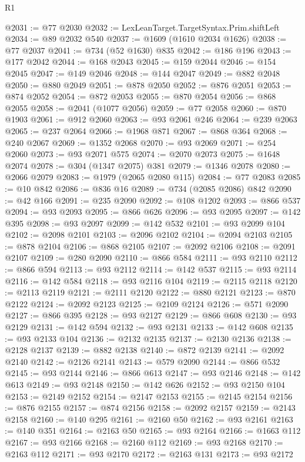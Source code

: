 \begin{lexlean}{R1}
\begin{coremodule}
@2031 := @77 @2030
@2032 := LexLeanTarget.TargetSyntax.Prim.shiftLeft
@2034 := @89 @2032 @540
@2037 := @1609 (@1610 @2034 @1626)
@2038 := @77 @2037
@2041 := @734 (@52 @1630) @835
@2042 := @186 @196
@2043 := @177 @2042
@2044 := @168 @2043
@2045 := @159 @2044
@2046 := @154 @2045
@2047 := @149 @2046
@2048 := @144 @2047
@2049 := @882 @2048
@2050 := @880 @2049
@2051 := @878 @2050
@2052 := @876 @2051
@2053 := @874 @2052
@2054 := @872 @2053
@2055 := @870 @2054
@2056 := @868 @2055
@2058 := @2041 (@1077 @2056)
@2059 := @77 @2058
@2060 := @870 @1903
@2061 := @912 @2060
@2063 := @93 @2061 @246
@2064 := @239 @2063
@2065 := @237 @2064
@2066 := @1968 @871
@2067 := @868 @364
@2068 := @240 @2067
@2069 := @1352 @2068
@2070 := @93 @2069
@2071 := @254 @2060
@2073 := @93 @2071 @575
@2074 := @2070 @2073
@2075 := @1648 @2074
@2078 := @304 (@1347 @2075) @381
@2079 := @1346 @2078
@2080 := @2066 @2079
@2083 := @1979 (@2065 @2080 @115)
@2084 := @77 @2083
@2085 := @10 @842
@2086 := @836 @16
@2089 := @734 (@2085 @2086) @842
@2090 := @42 @166
@2091 := @235 @2090
@2092 := @108 @1202
@2093 := @866 @537
@2094 := @93 @2093
@2095 := @866 @626
@2096 := @93 @2095
@2097 := @142 @395
@2098 := @93 @2097
@2099 := @142 @532
@2101 := @93 @2099 @104
@2102 := @2098 @2101
@2103 := @2096 @2102
@2104 := @2094 @2103
@2105 := @878 @2104
@2106 := @868 @2105
@2107 := @2092 @2106
@2108 := @2091 @2107
@2109 := @280 @2090
@2110 := @866 @584
@2111 := @93 @2110
@2112 := @866 @594
@2113 := @93 @2112
@2114 := @142 @537
@2115 := @93 @2114
@2116 := @142 @584
@2118 := @93 @2116 @104
@2119 := @2115 @2118
@2120 := @2113 @2119
@2121 := @2111 @2120
@2122 := @880 @2121
@2123 := @870 @2122
@2124 := @2092 @2123
@2125 := @2109 @2124
@2126 := @571 @2090
@2127 := @866 @395
@2128 := @93 @2127
@2129 := @866 @608
@2130 := @93 @2129
@2131 := @142 @594
@2132 := @93 @2131
@2133 := @142 @608
@2135 := @93 @2133 @104
@2136 := @2132 @2135
@2137 := @2130 @2136
@2138 := @2128 @2137
@2139 := @882 @2138
@2140 := @872 @2139
@2141 := @2092 @2140
@2142 := @2126 @2141
@2143 := @579 @2090
@2144 := @866 @532
@2145 := @93 @2144
@2146 := @866 @613
@2147 := @93 @2146
@2148 := @142 @613
@2149 := @93 @2148
@2150 := @142 @626
@2152 := @93 @2150 @104
@2153 := @2149 @2152
@2154 := @2147 @2153
@2155 := @2145 @2154
@2156 := @876 @2155
@2157 := @874 @2156
@2158 := @2092 @2157
@2159 := @2143 @2158
@2160 := @140 @295
@2161 := @2160 @50
@2162 := @93 @2161
@2163 := @140 @351
@2164 := @2163 @50
@2165 := @93 @2164
@2166 := @1663 @112
@2167 := @93 @2166
@2168 := @2160 @112
@2169 := @93 @2168
@2170 := @2163 @112
@2171 := @93 @2170
@2172 := @2163 @131
@2173 := @93 @2172

\end{coremodule}
\end{lexlean}
